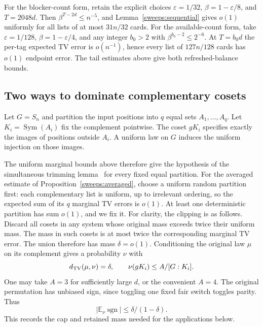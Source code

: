 For the blocker-count form, retain the explicit choices
$\varepsilon=1/32$, $\beta=1-\varepsilon/8$, and $T=2048d$.
Then $\beta^{T-2d}\le n^{-5}$, and
Lemma~\ref{sweeps:sequential} gives $o(1)$ uniformly for all lists of at most
$31n/32$ cards.  For the available-count form, take $\varepsilon=1/128$,
$\beta=1-\varepsilon/4$, and any integer $b_0>2$ with
$\beta^{b_0-2}\le2^{-6}$.  At $T=b_0d$ the per-tag expected TV error is
$o(n^{-1})$, hence every list of $127n/128$ cards has $o(1)$ endpoint error.
The tail estimates above give both refreshed-balance bounds.


\subsection{Two ways to dominate complementary cosets}\label{sweeps:truncation}
Let $G=S_n$ and partition the input positions into $q$ equal sets
$A_1,\ldots,A_q$.  Let $K_i=\operatorname{Sym}(A_i)$ fix the complement
pointwise.  The coset $gK_i$ specifies exactly the images of positions outside
$A_i$.  A uniform law on $G$ induces the uniform injection on those images.

The uniform marginal bounds above therefore give the hypothesis of
the simultaneous trimming lemma~\cite[Lemma~\ref*{l-l:trim}]{partialFourier} for every fixed equal partition.  For the averaged
estimate of Proposition~\ref{sweeps:averaged}, choose a uniform random
partition first: each complementary list is uniform, up to irrelevant
ordering, so the expected sum of its $q$ marginal TV errors is $o(1)$.
At least one deterministic partition has sum $o(1)$, and we fix it.
For clarity, the clipping is as follows.  Discard all cosets in any system
whose original mass exceeds twice their uniform mass.  The mass in such
cosets is at most twice the corresponding marginal TV error.  The union
therefore has mass $\delta=o(1)$.  Conditioning the original law $\mu$ on
its complement gives a probability $\nu$ with
\begin{equation}\label{sweeps:coset-bound}
 d_{\rm TV}(\mu,\nu)=\delta,\qquad
 \nu(gK_i)\le A/[G:K_i].
\end{equation}
One may take $A=3$ for sufficiently large $d$, or the convenient $A=4$.
The original permutation has unbiased sign, since toggling one fixed fair
switch toggles parity.  Thus
\begin{equation}\label{sweeps:sign}
 |\mathbb E_\nu\operatorname{sgn}|
 \le\delta/(1-\delta).
\end{equation}
This records the cap and retained mass needed for the applications below.

